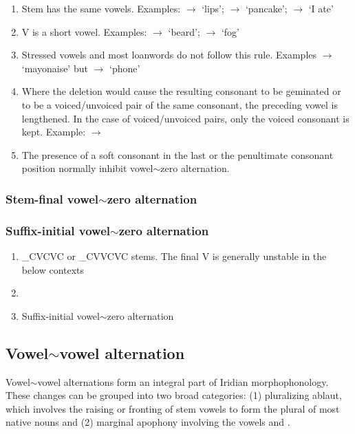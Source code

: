 \begin{enumerate}
	\item Stem has the same vowels. Examples:  $\rightarrow$  `lips';  $\rightarrow$  `pancake';  $\rightarrow$  `I ate'
	\item V is a short vowel. Examples:  $\rightarrow$  `beard';  $\rightarrow$  `fog'
	\item Stressed vowels and most loanwords do not follow this rule. Examples  $\rightarrow$  `mayonaise' but  $\rightarrow$  `phone'
	\item Where the deletion would cause the resulting consonant to be geminated or to be a voiced/unvoiced pair of the same consonant, the preceding vowel is lengthened. In the case of voiced/unvoiced pairs, only the voiced consonant is kept. Example:  $\rightarrow$ 
	\item The presence of a soft consonant in the last or the penultimate consonant position normally inhibit vowel$\sim$zero alternation.
\end{enumerate}


\subsubsection{Stem-final vowel$\sim$zero alternation}

\subsubsection{Suffix-initial vowel$\sim$zero alternation}

\begin{enumerate}
	\item \_CVCVC or \_CVVCVC stems. The final V is generally unstable in the below contexts

	\item 
	\item Suffix-initial vowel$\sim$zero alternation
\end{enumerate}

\subsection{Vowel$\sim$vowel alternation}
\par Vowel$\sim$vowel alternations form an integral part of Iridian morphophonology. These changes can be grouped into two broad categories: (1) pluralizing ablaut, which involves the raising or fronting of stem vowels to form the plural of most native nouns and (2) marginal apophony involving the vowels  and .

